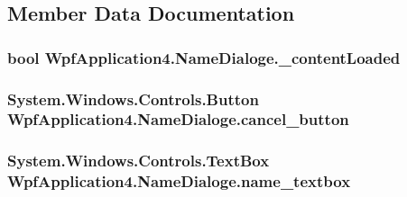 \subsection{Member Data Documentation}
\hypertarget{classWpfApplication4_1_1NameDialoge_ad215f27c234ccc67665ebfb168138fa2}{
\subsubsection[{\-\_\-content\-Loaded}]{\setlength{\rightskip}{0pt plus 5cm}bool Wpf\-Application4.\-Name\-Dialoge.\-\_\-content\-Loaded\hspace{0.3cm}{\ttfamily [private]}}}\label{classWpfApplication4_1_1NameDialoge_ad215f27c234ccc67665ebfb168138fa2}
\hypertarget{classWpfApplication4_1_1NameDialoge_a159e41148753b8f8569224df378664f0}{
\subsubsection[{cancel\-\_\-button}]{\setlength{\rightskip}{0pt plus 5cm}System.\-Windows.\-Controls.\-Button Wpf\-Application4.\-Name\-Dialoge.\-cancel\-\_\-button\hspace{0.3cm}{\ttfamily [package]}}}\label{classWpfApplication4_1_1NameDialoge_a159e41148753b8f8569224df378664f0}
\hypertarget{classWpfApplication4_1_1NameDialoge_a9cc6d5b5dfd140e835e30b6abd20f629}{
\subsubsection[{name\-\_\-textbox}]{\setlength{\rightskip}{0pt plus 5cm}System.\-Windows.\-Controls.\-Text\-Box Wpf\-Application4.\-Name\-Dialoge.\-name\-\_\-textbox\hspace{0.3cm}{\ttfamily [package]}}}\label{classWpfApplication4_1_1NameDialoge_a9cc6d5b5dfd140e835e30b6abd20f629}
